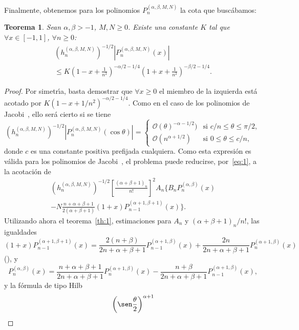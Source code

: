 \documentclass[a4paper]{article}
\newtheorem{theorem}{Teorema}
\newcommand{\calO}{\mathcal{O}}
\begin{document}
Finalmente, obtenemos para los polinomios $P^{(\alpha,\beta,M,N)}_{n}$ 
la cota que busc\'{a}bamos:

\begin{theorem}
Sean $\alpha, \beta > -1$, $M,N \geq 0$.
Existe una constante $K$ tal que $\forall x \in [-1,1]$, $\forall n \geq 0$:
\begin{multline*}
(h^{(\alpha,\beta,M,N)}_{n})^{-1/2} |P^{(\alpha,\beta,M,N)}_{n}(x)| \\
\leq K \left(1-x + \frac{1}{n^{2}} \right)^{-\alpha/2-1/4}
\left(1+x + \frac{1}{n^{2}} \right)^{-\beta/2-1/4}.
\end{multline*}
\end{theorem}

\begin{proof}
Por simetr\'{\i}a, basta demostrar que $\forall x \geq 0$
el miembro de la izquierda est\'{a} acotado por
$K (1-x + {1}/{n^{2}} )^{-\alpha/2-1/4}$. Como en el caso de 
los polinomios de Jacobi~\cite{Mu}, ello ser\'{a} cierto si se tiene
$$
(h^{(\alpha,\beta,M,N)}_{n})^{-1/2} |P^{(\alpha,\beta,M,N)}_{n}(\cos \theta)|
=
\begin{cases}
\calO(\theta)^{-\alpha-1/2}) & \text{si } c/n \leq \theta \leq \pi/2, \\
\calO(n^{\alpha+1/2}) & \text{si } 0 \leq \theta \leq c/n, 
\end{cases}
$$
donde $c$ es una constante positiva prefijada cualquiera. Como 
esta expresi\'{o}n es v\'{a}lida para los polinomios de
Jacobi~\cite[T.~7.32.2]{Sz}, el problema puede reducirse,
por~\eqref{eq:1}, a la acotaci\'{o}n de
\begin{multline*}
(h^{(\alpha,\beta,M,N)}_{n})^{-1/2} 
\left[\frac{(\alpha+\beta+1)_{n}}{n!}\right]^{2}
A_{n} \bigg\{B_{n}P^{(\alpha,\beta)}_{n}(x) \\
- N \frac{n+\alpha+\beta+1}{2(\alpha+\beta+1)} (1+x) 
P^{(\alpha+1,\beta+1)}_{n-1}(x) \bigg\}.
\end{multline*}
Utilizando ahora el teorema~\ref{th:1}, estimaciones para $A_{n}$
y $(\alpha+\beta+1)_{n}/{n!}$, las igualdades
$$
(1+x) P^{(\alpha+1,\beta+1)}_{n-1}(x) 
= \frac{2(n+\beta)}{2n+\alpha+\beta+1}  P^{(\alpha+1,\beta)}_{n-1}(x) 
+ \frac{2n}{2n+\alpha+\beta+1}  P^{(\alpha+1,\beta)}_{n}(x) 
$$
(\cite[4.5.4]{Sz}), y
$$
P^{(\alpha,\beta)}_{n}(x) = \frac{n+\alpha+\beta+1}{2n+\alpha+\beta+1} 
P^{(\alpha+1,\beta)}_{n}(x) - \frac{n+\beta}{2n+\alpha+\beta+1} 
P^{(\alpha+1,\beta)}_{n-1}(x) ,
$$
y la f\'{o}rmula de tipo Hilb \cite[T.~8.21.12]{Sz}
\begin{multline*}
\left(\sen \frac{\theta}{2}\right)^{\alpha+1}

\end{multline*}
\end{proof}
\end{document}
